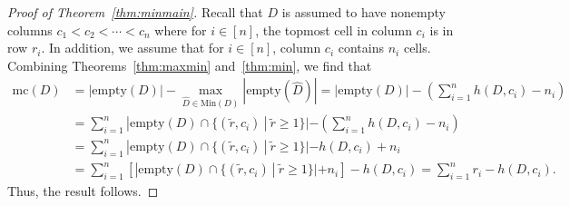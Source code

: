 \documentclass[letterpaper,10pt]{article}
\begin{document}
\begin{proof}[Proof of Theorem~\ref{thm:minmain}]
    Recall that $D$ is assumed to have nonempty columns $c_1<c_2<\cdots<c_n$ where for $i\in [n]$, the topmost cell in column $c_i$ is in row $r_i$. In addition, we assume that for $i\in [n]$, column $c_i$ contains $n_i$ cells. Combining Theorems~\ref{thm:maxmin} and~\ref{thm:min}, we find that 
    \begin{align*}
        \mathrm{mc}(D)&=|\mathrm{empty}(D)|-\max_{\widehat{D}\in\mathrm{Min}(D)}|\mathrm{empty}(\widehat{D})|=|\mathrm{empty}(D)|-\left(\sum_{i=1}^nh(D,c_i)-n_i\right)\\
        &=\sum_{i=1}^n|\mathrm{empty}(D)\cap\{(\tilde{r},c_i)~|~\tilde{r}\ge 1\}|-\left(\sum_{i=1}^nh(D,c_i)-n_i\right)\\
        &=\sum_{i=1}^n|\mathrm{empty}(D)\cap\{(\tilde{r},c_i)~|~\tilde{r}\ge 1\}|-h(D,c_i)+n_i\\
        &=\sum_{i=1}^n[|\mathrm{empty}(D)\cap\{(\tilde{r},c_i)~|~\tilde{r}\ge 1\}|+n_i]-h(D,c_i)=\sum_{i=1}^nr_i-h(D,c_i).
    \end{align*}
    Thus, the result follows.
\end{proof}
\end{document}

